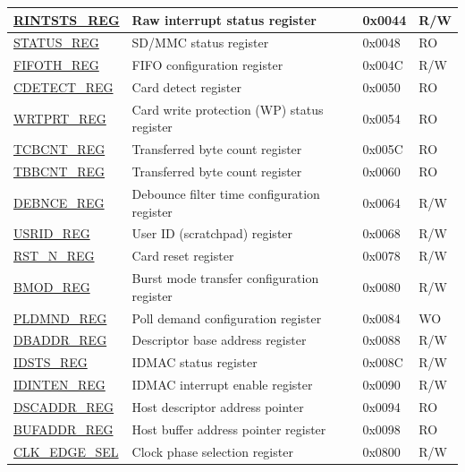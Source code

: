 \begin{longtable}{ | p{4cm} | p{7.5cm} | p{2cm} | p{1cm} | }
\hyperref[regdesc:RINTSTSREG]{RINTSTS\_REG} & Raw interrupt status register & 0x0044 & R/W \\ \hline
\hyperref[regdesc:STATUSREG]{STATUS\_REG} & SD/MMC status register & 0x0048 & RO \\ \hline
\hyperref[regdesc:FIFOTHREG]{FIFOTH\_REG} & FIFO configuration register & 0x004C & R/W \\ \hline
\hyperref[regdesc:CDETECTREG]{CDETECT\_REG} & Card detect register & 0x0050 & RO \\ \hline
\hyperref[regdesc:WRTPRTREG]{WRTPRT\_REG} & Card write protection (WP) status register & 0x0054 & RO \\ \hline
\hyperref[regdesc:TCBCNTREG]{TCBCNT\_REG} & Transferred byte count register & 0x005C & RO \\ \hline
\hyperref[regdesc:TBBCNTREG]{TBBCNT\_REG} & Transferred byte count register & 0x0060 & RO \\ \hline
\hyperref[regdesc:DEBNCEREG]{DEBNCE\_REG} & Debounce filter time configuration register & 0x0064 & R/W \\ \hline
\hyperref[regdesc:USRIDREG]{USRID\_REG} & User ID (scratchpad) register & 0x0068 & R/W \\ \hline
\hyperref[regdesc:RSTNREG]{RST\_N\_REG} & Card reset register& 0x0078 & R/W \\ \hline
\hyperref[regdesc:BMODREG]{BMOD\_REG} & Burst mode transfer configuration register & 0x0080 & R/W \\ \hline
\hyperref[regdesc:PLDMNDREG]{PLDMND\_REG} & Poll demand configuration register & 0x0084 & WO \\ \hline
\hyperref[regdesc:DBADDRREG]{DBADDR\_REG} & Descriptor base address register & 0x0088 & R/W \\ \hline
\hyperref[regdesc:IDSTSREG]{IDSTS\_REG} & IDMAC status register & 0x008C & R/W \\ \hline
\hyperref[regdesc:IDINTENREG]{IDINTEN\_REG} & IDMAC interrupt enable register & 0x0090 & R/W \\ \hline
\hyperref[regdesc:DSCADDRREG]{DSCADDR\_REG} & Host descriptor address pointer & 0x0094 & RO \\ \hline
\hyperref[regdesc:BUFADDRREG]{BUFADDR\_REG} & Host buffer address pointer register & 0x0098 & RO \\ \hline
\hyperref[regdesc:CLKEDGESEL]{CLK\_EDGE\_SEL}& Clock phase selection register&0x0800&R/W \\\hline
\end{longtable}